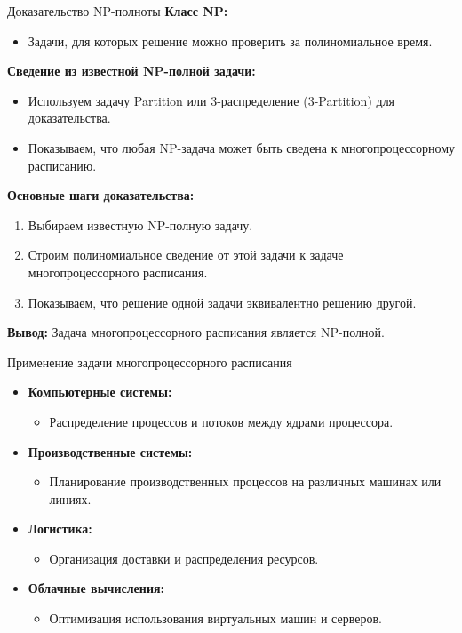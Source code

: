 \documentclass{beamer}
\begin{document}
\begin{frame}{Доказательство NP-полноты}
    \textbf{Класс NP:}
    \begin{itemize}
        \item Задачи, для которых решение можно проверить за полиномиальное время.
    \end{itemize}
    
    \textbf{Сведение из известной NP-полной задачи:}
    \begin{itemize}
        \item Используем задачу Partition или 3-распределение (3-Partition) для доказательства.
        \item Показываем, что любая NP-задача может быть сведена к многопроцессорному расписанию.
    \end{itemize}
    
    \textbf{Основные шаги доказательства:}
    \begin{enumerate}
        \item Выбираем известную NP-полную задачу.
        \item Строим полиномиальное сведение от этой задачи к задаче многопроцессорного расписания.
        \item Показываем, что решение одной задачи эквивалентно решению другой.
    \end{enumerate}
    
    \textbf{Вывод:}
    Задача многопроцессорного расписания является NP-полной.
\end{frame}

\begin{frame}{Применение задачи многопроцессорного расписания}
    \begin{itemize}
        \item \textbf{Компьютерные системы:}
        \begin{itemize}
            \item Распределение процессов и потоков между ядрами процессора.
        \end{itemize}
        \item \textbf{Производственные системы:}
        \begin{itemize}
            \item Планирование производственных процессов на различных машинах или линиях.
        \end{itemize}
        \item \textbf{Логистика:}
        \begin{itemize}
            \item Организация доставки и распределения ресурсов.
        \end{itemize}
        \item \textbf{Облачные вычисления:}
        \begin{itemize}
            \item Оптимизация использования виртуальных машин и серверов.
        \end{itemize}
    \end{itemize}
\end{frame}
\end{document}
